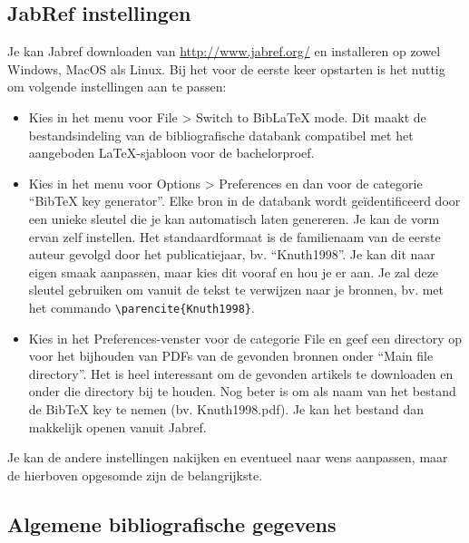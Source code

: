 \subsection{JabRef instellingen}
\label{sub:jabref_instellingen}

Je kan Jabref downloaden van \url{http://www.jabref.org/} en installeren op zowel Windows, MacOS als Linux. Bij het voor de eerste keer opstarten is het nuttig om volgende instellingen aan te passen:

\begin{itemize}
  \item Kies in het menu voor File > Switch to BibLaTeX mode. Dit maakt de bestandsindeling van de bibliografische databank compatibel met het aangeboden {\LaTeX}-sjabloon voor de bachelorproef.
  \item Kies in het menu voor Options > Preferences en dan voor de categorie ``BibTeX key generator''. Elke bron in de databank wordt geïdentificeerd door een unieke sleutel die je kan automatisch laten genereren. Je kan de vorm ervan zelf instellen. Het standaardformaat is de familienaam van de eerste auteur gevolgd door het publicatiejaar, bv. ``Knuth1998''. Je kan dit naar eigen smaak aanpassen, maar kies dit vooraf en hou je er aan. Je zal deze sleutel gebruiken om vanuit de tekst te verwijzen naar je bronnen, bv. met het commando \verb|\parencite{Knuth1998}|.
  \item Kies in het Preferences-venster voor de categorie File en geef een directory op voor het bijhouden van PDFs van de gevonden bronnen onder ``Main file directory''. Het is heel interessant om de gevonden artikels te downloaden en onder die directory bij te houden. Nog beter is om als naam van het bestand de BibTeX key te nemen (bv. Knuth1998.pdf). Je kan het bestand dan makkelijk openen vanuit Jabref.
\end{itemize}

Je kan de andere instellingen nakijken en eventueel naar wens aanpassen, maar de hierboven opgesomde zijn de belangrijkste.

\subsection{Algemene bibliografische gegevens}
\label{sub:algemene_bibliografische_gegevens}

